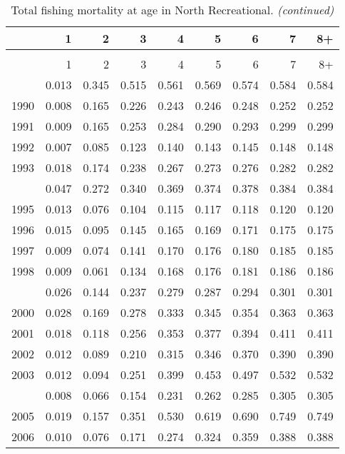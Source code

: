 \documentclass[
]{article}
\begin{document}
\begin{longtable}[t]{lrrrrrrrr}
\caption{\label{tab:North_Recreational-fleet-FAA-table}Total fishing mortality at age in North Recreational.}\\
\toprule
  & 1 & 2 & 3 & 4 & 5 & 6 & 7 & 8+\\
\midrule
\endfirsthead
\caption[]{Total fishing mortality at age in North Recreational. \textit{(continued)}}\\
\toprule
  & 1 & 2 & 3 & 4 & 5 & 6 & 7 & 8+\\
\midrule
\endhead

\endfoot
\bottomrule
\endlastfoot
1989 & 0.013 & 0.345 & 0.515 & 0.561 & 0.569 & 0.574 & 0.584 & 0.584\\
1990 & 0.008 & 0.165 & 0.226 & 0.243 & 0.246 & 0.248 & 0.252 & 0.252\\
1991 & 0.009 & 0.165 & 0.253 & 0.284 & 0.290 & 0.293 & 0.299 & 0.299\\
1992 & 0.007 & 0.085 & 0.123 & 0.140 & 0.143 & 0.145 & 0.148 & 0.148\\
1993 & 0.018 & 0.174 & 0.238 & 0.267 & 0.273 & 0.276 & 0.282 & 0.282\\
\addlinespace
1994 & 0.047 & 0.272 & 0.340 & 0.369 & 0.374 & 0.378 & 0.384 & 0.384\\
1995 & 0.013 & 0.076 & 0.104 & 0.115 & 0.117 & 0.118 & 0.120 & 0.120\\
1996 & 0.015 & 0.095 & 0.145 & 0.165 & 0.169 & 0.171 & 0.175 & 0.175\\
1997 & 0.009 & 0.074 & 0.141 & 0.170 & 0.176 & 0.180 & 0.185 & 0.185\\
1998 & 0.009 & 0.061 & 0.134 & 0.168 & 0.176 & 0.181 & 0.186 & 0.186\\
\addlinespace
1999 & 0.026 & 0.144 & 0.237 & 0.279 & 0.287 & 0.294 & 0.301 & 0.301\\
2000 & 0.028 & 0.169 & 0.278 & 0.333 & 0.345 & 0.354 & 0.363 & 0.363\\
2001 & 0.018 & 0.118 & 0.256 & 0.353 & 0.377 & 0.394 & 0.411 & 0.411\\
2002 & 0.012 & 0.089 & 0.210 & 0.315 & 0.346 & 0.370 & 0.390 & 0.390\\
2003 & 0.012 & 0.094 & 0.251 & 0.399 & 0.453 & 0.497 & 0.532 & 0.532\\
\addlinespace
2004 & 0.008 & 0.066 & 0.154 & 0.231 & 0.262 & 0.285 & 0.305 & 0.305\\
2005 & 0.019 & 0.157 & 0.351 & 0.530 & 0.619 & 0.690 & 0.749 & 0.749\\
2006 & 0.010 & 0.076 & 0.171 & 0.274 & 0.324 & 0.359 & 0.388 & 0.388\\

\end{longtable}
\end{document}
